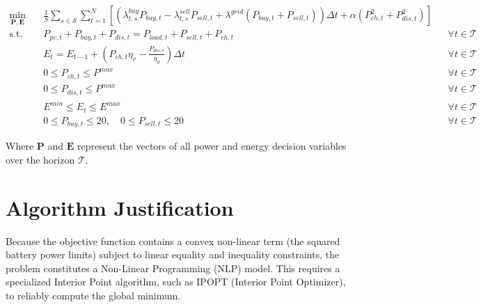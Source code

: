 \documentclass[12pt, a4paper]{article}
\begin{document}
\begin{equation}
\begin{aligned}
\min_{\mathbf{P}, \mathbf{E}} \quad & \frac{1}{S} \sum_{s \in \mathcal{S}} \sum_{t=1}^{N} \left[ \left( \lambda^{buy}_{t,s} P_{buy,t} - \lambda^{sell}_{t,s} P_{sell,t} + \lambda^{grid}(P_{buy,t} + P_{sell,t}) \right) \Delta t + \alpha \left( P_{ch,t}^2 + P_{dis,t}^2 \right) \right] \\
\text{s.t.} \quad & P_{pv,t} + P_{buy,t} + P_{dis,t} = P_{load,t} + P_{sell,t} + P_{ch,t} && \forall t \in \mathcal{T} \\
& E_t = E_{t-1} + \left( P_{ch,t} \eta_{c} - \frac{P_{dis,t}}{\eta_{d}} \right) \Delta t && \forall t \in \mathcal{T} \\
& 0 \le P_{ch,t} \le P^{max} && \forall t \in \mathcal{T} \\
& 0 \le P_{dis,t} \le P^{max} && \forall t \in \mathcal{T} \\
& E^{min} \le E_t \le E^{max} && \forall t \in \mathcal{T} \\
& 0 \le P_{buy,t} \le 20, \quad 0 \le P_{sell,t} \le 20 && \forall t \in \mathcal{T}
\end{aligned}
\end{equation}

Where $\mathbf{P}$ and $\mathbf{E}$ represent the vectors of all power and energy decision variables over the horizon $\mathcal{T}$.

\section{Algorithm Justification}
Because the objective function contains a convex non-linear term (the squared battery power limits) subject to linear equality and inequality constraints, the problem constitutes a Non-Linear Programming (NLP) model. This requires a specialized Interior Point algorithm, such as IPOPT (Interior Point Optimizer), to reliably compute the global minimum.
\end{document}
